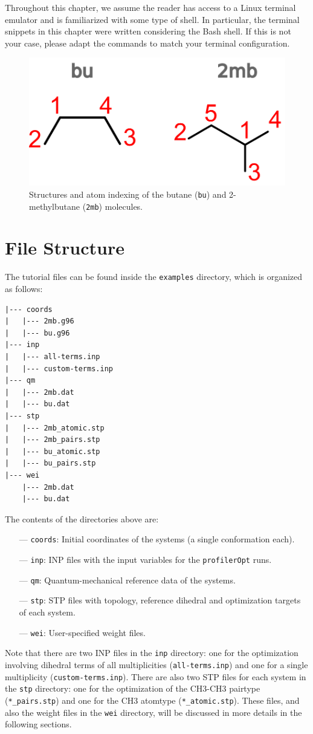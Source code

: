 \documentclass[10pt,a4paper]{report}
\numberwithin{equation}{section}
\newcommand{\under}{\_}
\newcommand{\profileropt}[0]{\texttt{profilerOpt}}
\begin{document}
Throughout this chapter, we assume the reader has access to a Linux
terminal emulator and is familiarized with some type of shell.
%
In particular, the terminal snippets in this chapter were written
considering the Bash shell.
%
If this is not your case, please adapt the commands to match your
terminal configuration.

\begin{figure}[tb]
  \centering
  \includegraphics[width=.3\textwidth]{alkane-structures}
  \caption{Structures and atom indexing of the butane (\texttt{bu})
    and 2-methylbutane (\texttt{2mb}) molecules.}
  \label{fig:alkane-structures}
\end{figure}

\section{File Structure}
\label{sec:tutorial-file-structure}

The tutorial files can be found inside the \texttt{examples}
directory, which is organized as follows:

\begin{lstlisting}
|--- coords
|   |--- 2mb.g96
|   |--- bu.g96
|--- inp
|   |--- all-terms.inp
|   |--- custom-terms.inp
|--- qm
|   |--- 2mb.dat
|   |--- bu.dat
|--- stp
|   |--- 2mb_atomic.stp
|   |--- 2mb_pairs.stp
|   |--- bu_atomic.stp
|   |--- bu_pairs.stp
|--- wei
    |--- 2mb.dat
    |--- bu.dat
\end{lstlisting}
\vspace{-2ex}\par

\noindent The contents of the directories above are:
\begin{itemize}
\item [---] \texttt{coords}: Initial coordinates of the systems (a single conformation each).
\item [---] \texttt{inp}: INP files with the input variables for the \profileropt{} runs. 
\item [---] \texttt{qm}: Quantum-mechanical reference data of the systems.
\item [---] \texttt{stp}: STP files with topology, reference dihedral and optimization targets of each system.
\item [---] \texttt{wei}: User-specified weight files.
\end{itemize}
%
Note that there are two INP files in the \texttt{inp} directory: one
for the optimization involving dihedral terms of all multiplicities
(\texttt{all-terms.inp}) and one for a single multiplicity
(\texttt{custom-terms.inp}).
%
There are also two STP files for each system in the \texttt{stp}
directory: one for the optimization of the CH3-CH3 pairtype
(\texttt{*\under{}pairs.stp}) and one for the CH3 atomtype
(\texttt{*\under{}atomic.stp}).
%
These files, and also the weight files in the \texttt{wei} directory,
will be discussed in more details in the following sections.
\end{document}
